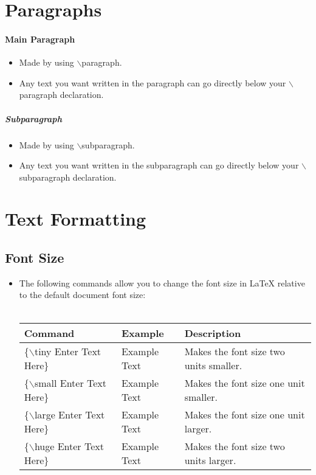 \section{Paragraphs}
	\paragraph{Main Paragraph}
		\begin{itemize}
			\item Made by using $\backslash$paragraph.
			\item Any text you want written in the paragraph can go directly below your $\backslash$paragraph declaration.
		\end{itemize}

	\subparagraph{Subparagraph}
		\begin{itemize}
			\item Made by using $\backslash$subparagraph.
			\item Any text you want written in the subparagraph can go directly below your $\backslash$subparagraph declaration.
		\end{itemize}

\section{Text Formatting}
	\subsection{Font Size}
		\begin{itemize}
			\item The following commands allow you to change the font size in \LaTeX{} relative to the default document font size:\\\\
			\def\arraystretch{2.25}
			\begin{tabularx}{\textwidth}{|l|X|X|}
				\hline
				Command & Example & Description\\
				\hline
				\{$\backslash$tiny Enter Text Here\} & {\tiny Example Text} & Makes the font size two units smaller.\\
				\hline
				\{$\backslash$small Enter Text Here\} & {\small Example Text} & Makes the font size one unit smaller.\\
				\hline
				\{$\backslash$large Enter Text Here\} & {\large Example Text} & Makes the font size one unit larger.\\
				\hline
				\{$\backslash$huge Enter Text Here\} & {\huge Example Text} & Makes the font size two units larger.\\
				\hline
			\end{tabularx}
		\end{itemize}

